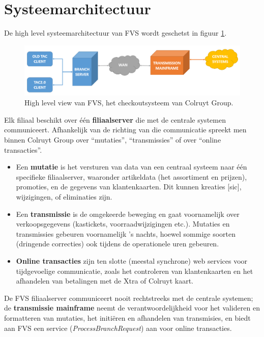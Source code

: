\section{Systeemarchitectuur}

De high level systeemarchitectuur van FVS wordt geschetst in figuur \ref{fig:FVSHighLevel}.

\begin{figure}[h!]
    \centering
    \includegraphics[scale=0.35]{img/func-omsch/DiagramHighLevel.PNG}
    \caption{High level view van FVS, het checkoutsysteem van Colruyt Group.}
    \label{fig:FVSHighLevel}
\end{figure}

Elk filiaal beschikt over één \textbf{filiaalserver} die met de centrale systemen communiceert. Afhankelijk van de richting van die communicatie spreekt men binnen Colruyt Group over ``mutaties'', ``transmissies'' of over ``online transacties''.

\begin{itemize}
    \item Een \textbf{mutatie} is het versturen van data van een centraal systeem naar één specifieke filiaalserver, waaronder artikeldata (het assortiment en prijzen), promoties, en de gegevens van klantenkaarten. Dit kunnen kreaties [sic], wijzigingen, of eliminaties zijn.
    \item Een \textbf{transmissie} is de omgekeerde beweging en gaat voornamelijk over verkoopsgegevens (kastickets, voorraadwijzigingen etc.). Mutaties en transmissies gebeuren voornamelijk 's nachts, hoewel sommige soorten (dringende correcties) ook tijdens de operationele uren gebeuren.
    \item \textbf{Online transacties} zijn ten slotte (meestal synchrone) web services voor tijdgevoelige communicatie, zoals het controleren van klantenkaarten en het afhandelen van betalingen met de Xtra of Colruyt kaart.
\end{itemize}

De FVS filiaalserver communiceert nooit rechtstreeks met de centrale systemen; de \textbf{transmissie mainframe} neemt de verantwoordelijkheid voor het valideren en formatteren van mutaties, het initiëren en afhandelen van transmisies, en biedt aan FVS een service (\emph{ProcessBranchRequest}) aan voor online transacties.

